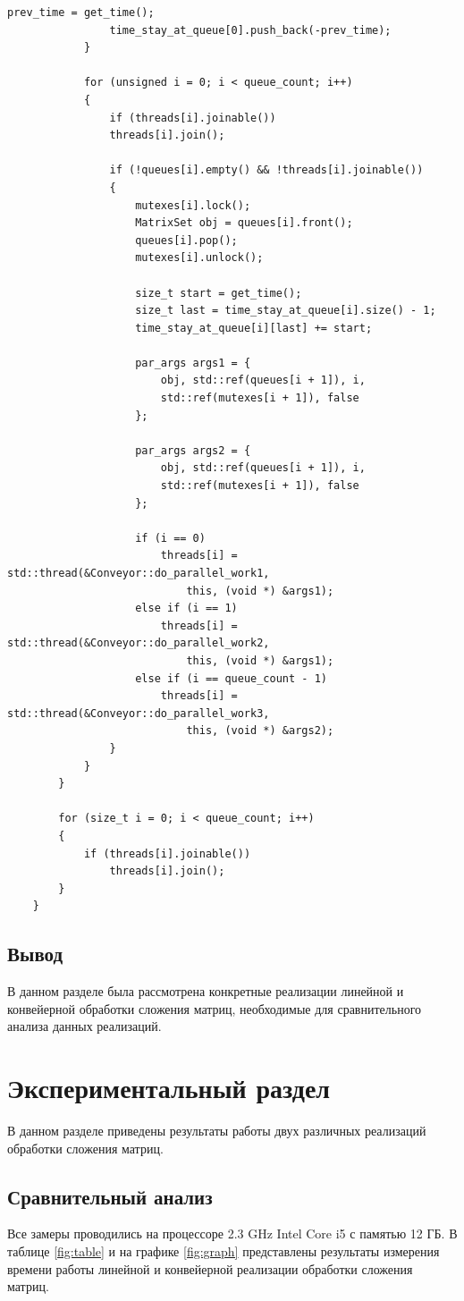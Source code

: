 \documentclass[12pt, a4paper]{report}
\begin{document}
\begin{lstlisting}[label=code:par,caption=Реализация параллельной обработки матрицы]
				prev_time = get_time();
				time_stay_at_queue[0].push_back(-prev_time);
			}
		
			for (unsigned i = 0; i < queue_count; i++)
			{
				if (threads[i].joinable())
				threads[i].join();
			
				if (!queues[i].empty() && !threads[i].joinable())
				{
					mutexes[i].lock();
					MatrixSet obj = queues[i].front();
					queues[i].pop();
					mutexes[i].unlock();
			
					size_t start = get_time();
					size_t last = time_stay_at_queue[i].size() - 1;
					time_stay_at_queue[i][last] += start;
					
					par_args args1 = {
						obj, std::ref(queues[i + 1]), i,
						std::ref(mutexes[i + 1]), false
					};
			
					par_args args2 = {
						obj, std::ref(queues[i + 1]), i,
						std::ref(mutexes[i + 1]), false
					};
			
					if (i == 0)
						threads[i] = std::thread(&Conveyor::do_parallel_work1,
							this, (void *) &args1);
					else if (i == 1)
						threads[i] = std::thread(&Conveyor::do_parallel_work2,
							this, (void *) &args1);
					else if (i == queue_count - 1)
						threads[i] = std::thread(&Conveyor::do_parallel_work3,
							this, (void *) &args2);
				}
			}
		}
		
		for (size_t i = 0; i < queue_count; i++)
		{
			if (threads[i].joinable())
				threads[i].join();
		}
	}
	\end{lstlisting}
	
	\section{Вывод}
	\hspace{0.5cm}В данном разделе была рассмотрена конкретные реализации линейной и конвейерной обработки сложения матриц, необходимые для сравнительного анализа данных реализаций.
			
	\chapter{Экспериментальный раздел}
	\hspace{0.5cm}В данном разделе приведены результаты работы двух различных реализаций обработки сложения матриц.
	
	\section{Сравнительный анализ}
	\hspace{0.5cm}Все замеры проводились на процессоре 2.3 GHz Intel Core i5 с памятью 12 ГБ. В таблице \ref{fig:table} и на графике \ref{fig:graph}
	представлены результаты измерения времени работы линейной и конвейерной реализации обработки сложения матриц.
\end{document}
